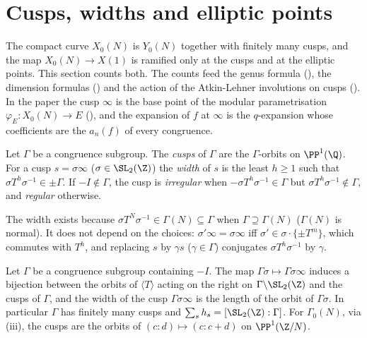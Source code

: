 \section{Cusps, widths and elliptic points}\label{sec:modforms:cusps}

The compact curve $X_0(N)$ is $Y_0(N)$ together with finitely many cusps, and the map $X_0(N)\to X(1)$ is ramified only at the cusps and at the
elliptic points. This section counts both. The counts feed the genus formula (), the dimension formulas
() and the action of the Atkin-Lehner involutions on cusps (). In the paper
the cusp $\infty$ is the base point of the modular parametrisation $\varphi_E\colon X_0(N)\to E$ (), and the expansion of $f$ at $\infty$ is the
$q$-expansion whose coefficients are the $a_n(f)$ of every congruence.

\begin{definition}\label{def:modforms:cusp-width}
Let $\Gamma$ be a congruence subgroup. The \emph{cusps} of $\Gamma$ are the $\Gamma$-orbits on $\PP^1(\Q)$. For a cusp $s=\sigma\infty$ ($\sigma\in\SL_2(\Z)$) the
\emph{width} of $s$ is the least $h\ge1$ such that $\sigma T^h\sigma^{-1}\in\pm\Gamma$. If $-I\notin\Gamma$, the cusp is \emph{irregular} when $-\sigma T^h\sigma^{-1}\in\Gamma$ but
$\sigma T^h\sigma^{-1}\notin\Gamma$, and \emph{regular} otherwise.
\end{definition}

The width exists because $\sigma T^N\sigma^{-1}\in\Gamma(N)\subseteq\Gamma$ when $\Gamma\supseteq\Gamma(N)$ ($\Gamma(N)$ is normal). It does not depend on the choices: $\sigma'\infty=\sigma\infty$ iff
$\sigma'\in\sigma\cdot\{\pm T^m\}$, which commutes with $T^h$, and replacing $s$ by $\gamma s$ ($\gamma\in\Gamma$) conjugates $\sigma T^h\sigma^{-1}$ by $\gamma$.

\begin{proposition}\label{prop:modforms:cusps-orbits}
Let $\Gamma$ be a congruence subgroup containing $-I$. The map $\Gamma\sigma\mapsto\Gamma\sigma\infty$ induces a bijection between the orbits of $\langle T\rangle$ acting on the right on
$\Gamma\backslash\SL_2(\Z)$ and the cusps of $\Gamma$, and the width of the cusp $\Gamma\sigma\infty$ is the length of the orbit of $\Gamma\sigma$. In particular $\Gamma$ has finitely many cusps
and $\sum_s h_s=[\SL_2(\Z):\Gamma]$. For $\Gamma_0(N)$, via (iii), the cusps are the orbits of $(c:d)\mapsto(c:c+d)$ on $\PP^1(\Z/N)$.
\end{proposition}

